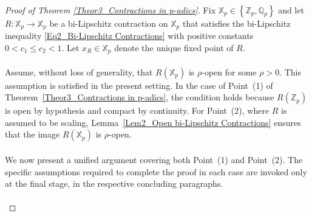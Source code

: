 \documentclass[a4paper, 12pt]{article}
\theoremstyle{definition}
\begin{document}
	
	
	
	
	
	
	
	
	
	\paragraph{} 
	
	
	\begin{proof}[Proof of Theorem \ref{Theor3_Contractions in p-adics}] 
		
		Fix $\mathbb{X}_{p} \in  \left\{  \mathbb{Z}_{p}, \mathbb{Q}_{p}  \right\} $ and let $R: \mathbb{X}_{p} \to \mathbb{X}_{p}$ be a bi-Lipschitz contraction on $\mathbb{X}_{p}$ that satisfies the bi-Lipschitz inequality \eqref{Eq2_Bi-Lipschitz Contractions} with positive constants $0  < c_{1} \le c_{2}  < 1$. Let $x_{R} \in \mathbb{X}_{p}$ denote the unique fixed point of $R$. 
		
		
		
		\paragraph{}
		
		Assume, without loss of generality, that $R \left(  \mathbb{X}_{p}  \right) $ is $\rho$-open for some $\rho > 0$. 
		This assumption is satisfied in the present setting. 
		In the case of Point~(1) of Theorem~\ref{Theor3_Contractions in p-adics}, the condition holds because $R \left(  \mathbb{Z}_{p}  \right) $ is open by hypothesis and compact by continuity. 
		For Point~(2), where $R$ is assumed to be scaling, Lemma~\ref{Lem2_Open bi-Lipschitz Contractions} ensures that the image $R \left(  \mathbb{X}_{p}  \right) $ is $\rho$-open.
		
		
		\paragraph{}
		
		We now present a unified argument covering both Point~(1) and Point~(2). The specific assumptions required to complete the proof in each case are invoked only at the final stage, in the respective concluding paragraphs. 
		
		
		
		\paragraph{}
		
		
		

\end{proof}
\end{document}
